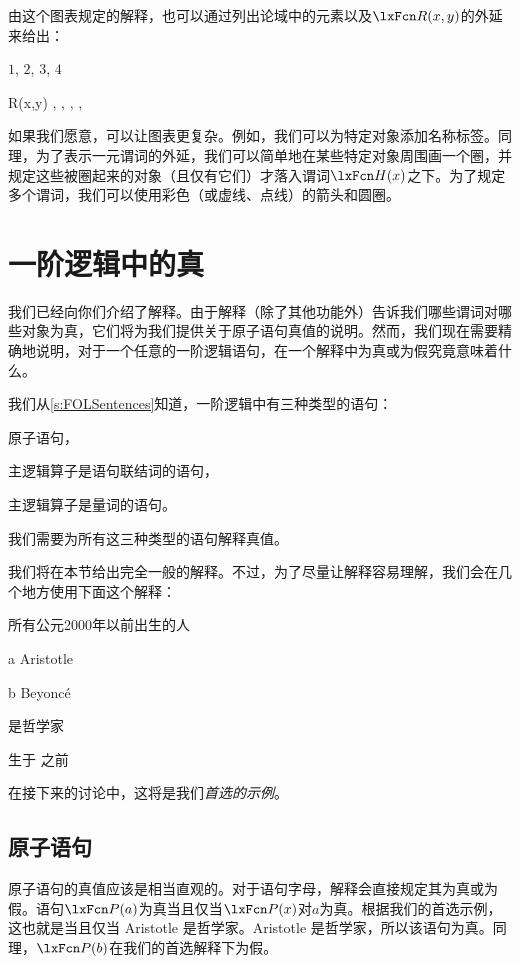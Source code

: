 由这个图表规定的解释，也可以通过列出论域中的元素以及$\atom{R}{x,y}$的外延来给出：


\begin{ekey}
	\item[\text{论域}] $1$, $2$, $3$, $4$
	\item[R(x,y)] ,
		,
		,
		,
	\end{ekey}


如果我们愿意，可以让图表更复杂。例如，我们可以为特定对象添加名称标签。同理，为了表示一元谓词的外延，我们可以简单地在某些特定对象周围画一个圈，并规定这些被圈起来的对象（且仅有它们）才落入谓词$\atom{H}{x}$之下。为了规定多个谓词，我们可以使用彩色（或虚线、点线）的箭头和圆圈。

\chapter{一阶逻辑中的真}\label{s:TruthFOL}
我们已经向你们介绍了解释。由于解释（除了其他功能外）告诉我们哪些谓词对哪些对象为真，它们将为我们提供关于原子语句真值的说明。然而，我们现在需要精确地说明，对于一个任意的一阶逻辑语句，在一个解释中为真或为假究竟意味着什么。

我们从\cref{s:FOLSentences}知道，一阶逻辑中有三种类型的语句：


\begin{compactlist}
		\item 原子语句，
		\item 主逻辑算子是语句联结词的语句，
		\item 主逻辑算子是量词的语句。
	\end{compactlist}


我们需要为所有这三种类型的语句解释真值。

我们将在本节给出完全一般的解释。不过，为了尽量让解释容易理解，我们会在几个地方使用下面这个解释：


\begin{ekey}
		\item[\text{论域}] 所有公元2000年以前出生的人
		\item[a] Aristotle
		\item[b] Beyoncé
		\item[\atom{P}{x}]  是哲学家
		\item[\atom{R}{x,y}]  生于  之前
	\end{ekey}


在接下来的讨论中，这将是我们\emph{首选的示例}。

\section{原子语句}
原子语句的真值应该是相当直观的。对于语句字母，解释会直接规定其为真或为假。语句$\atom{P}{a}$为真当且仅当$\atom{P}{x}$对$a$为真。根据我们的首选示例，这也就是当且仅当 Aristotle 是哲学家。Aristotle 是哲学家，所以该语句为真。同理，$\atom{P}{b}$在我们的首选解释下为假。

